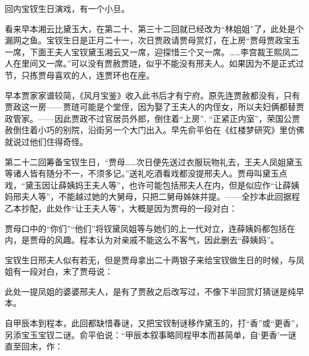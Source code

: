 \par 回内宝钗生日演戏，有一个小旦。
\par 看来早本湘云比黛玉大，在第二十、第三十二回就已经改为“林姐姐”了，此处是个漏网之鱼。宝钗生日是正月二十一，次日贾政请贾母赏灯，在上房“贾母贾政宝玉一席，下面王夫人宝钗黛玉湘云又一席，迎探惜三个又一席。……李宫裁王熙凤二人在里间又一席。”可以没有贾赦贾琏，似乎不能没有邢夫人。如果因为不是正式过节，只拣贾母喜欢的人，连贾环也在座。
\par 早本贾家家谱较简，《风月宝鉴》收入此书后才有宁府。原先连贾赦都没有，只有贾政这一房——贾琏可能是个堂侄，因为娶了王夫人的内侄女，所以夫妇俩都替贾政管家。——因此贾政不过官居员外郎，倒住着“上房”, “正紧正内室”，荣国公贾赦倒住着小巧的别院，沿街另一个大门出入。早先俞平伯在《红楼梦研究》里仿佛就说过他们住得奇怪。
\par 第二十二回筹备宝钗生日，“贾母……次日便先送过衣服玩物礼去，王夫人凤姐黛玉等诸人皆有随分不一，不须多记。”送礼吃酒看戏都没提邢夫人。贾母叫黛玉点戏，“黛玉因让薛姨妈王夫人等”，也许可能包括邢夫人在内，但是似应作“让薛姨妈邢夫人等”，不能越过她的大舅母，只把二舅母姊妹并提。——全抄本此回据程乙本抄配，此处作“让王夫人等”，大概是因为贾母的一段对白：
\par 贾母口中的“你们”“他们”将钗黛凤姐等与她们的上一代对立，连薛姨妈都包括在内，是贾母的风趣。程本认为对亲戚不能这么不客气，因此删去“薛姨妈”。
\par 宝钗生日邢夫人似有若无，但是贾母拿出二十两银子来给宝钗做生日的时候，与凤姐有一段对白，末了贾母说：
\par 此处一提凤姐的婆婆邢夫人，是有了贾赦之后改写过，不像下半回赏灯猜谜是纯早本。
\par 自甲辰本到程本，此回都缺惜春谜，又把宝钗制谜移作黛玉的，打“香”或“更香”，另添宝玉宝钗二谜。俞平伯说：“甲辰本叙事略同程甲本而甚简单，自‘更香’一谜直至回末，作：
